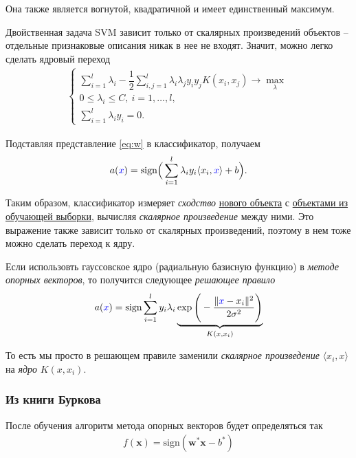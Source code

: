 \documentclass[%
	11pt,
	a4paper,
	utf8,
		]{article}
\begin{document}
\noindent Она также является вогнутой, квадратичной и имеет единственный максимум.

Двойственная задача SVM зависит только от скалярных произведений объектов -- отдельные признаковые описания никак в нее не входят. Значит, можно легко сделать ядровый переход
\begin{align*}
	\begin{cases}
		\sum\limits_{i=1}^l \lambda_i - \dfrac{1}{2} \sum\limits_{i,j=1}^l \lambda_i \lambda_j y_i y_j K(x_i, x_j) \to \max\limits_\lambda \\
		0 \leqslant \lambda_i \leqslant C, \ i = 1, \ldots, l, \\
		\sum\limits_{i=1}^l \lambda_i y_i = 0.
	\end{cases}
\end{align*}

Подставляя представление \eqref{eq:w} в классификатор, получаем
\begin{align*}
	a({\color{blue}x}) = \text{sign} \Big( \sum_{i=1}^l \lambda_i y_i \langle x_i, {\color{blue}x} \rangle + b \Big).
\end{align*}

Таким образом, {\color{blue}классификатор измеряет \emph{сходство} \underline{нового объекта} с \underline{объектами из обучающей выборки}, вычисляя \emph{скалярное произведение} между ними}. Это выражение также зависит только от скалярных произведений, поэтому в нем тоже можно сделать переход к ядру.

Если использовть гауссовское ядро (радиальную базисную функцию) в \emph{методе опорных векторов}, то получится следующее \emph{решающее правило}
\begin{align*}
	a({\color{blue}x}) = \text{sign} \sum_{i=1}^l y_i \lambda_i \underbrace{\exp \Bigg( - \dfrac{ \| {\color{blue}x} - x_i \|^2 }{ 2 \sigma^2 } \Bigg)}_{K(x, x_i)}
\end{align*}

То есть мы просто в решающем правиле заменили \emph{скалярное произведение} $ \langle x_i, x \rangle $ на \emph{ядро} $ K(x, x_i) $.

\subsubsection{Из книги Буркова}

После обучения алгоритм метода опорных векторов будет определяться так
\begin{align*}
	f(\mathbf{x}) = \text{sign} (\mathbf{w}^* \mathbf{x} - b^*)
\end{align*}
\end{document}
